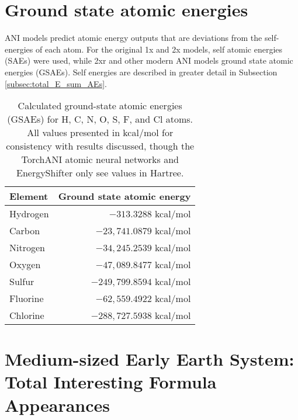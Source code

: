\chapter{Ground state atomic energies}
\label{appendix:GSAEs}
ANI models predict atomic energy outputs that are deviations from the self-energies of each atom. 
For the original 1x and 2x models, self atomic energies (SAEs) were used, while 2xr and other modern ANI models ground state atomic energies (GSAEs). 
Self energies are described in greater detail in Subsection \ref{subsec:total_E_sum_AEs}.


\begin{table}[hb!]
\label{tbl:GSAEs}
\center 
    \caption[$\omega$B97X ground-state atomic energies used in ANI-2xr]{Calculated ground-state atomic energies (GSAEs) for H, C, N, O, S, F, and Cl atoms. All values presented in kcal/mol for consistency with results discussed, though the TorchANI atomic neural networks and EnergyShifter only see values in Hartree.}
    \begin{tabular}{l r}
    \toprule
    Element & Ground state atomic energy \\
    \midrule
    Hydrogen & $-313.3288$ kcal/mol \\
    Carbon & $-23,741.0879$ kcal/mol \\
    Nitrogen & $-34,245.2539$ kcal/mol \\
    Oxygen & $-47,089.8477$ kcal/mol \\
    Sulfur & $-249,799.8594$ kcal/mol \\
    Fluorine & $-62,559.4922$ kcal/mol \\
    Chlorine & $-288,727.5938$ kcal/mol \\
    \bottomrule
    \end{tabular}
\end{table}


\chapter{Medium-sized Early Earth System: Total Interesting Formula Appearances}


